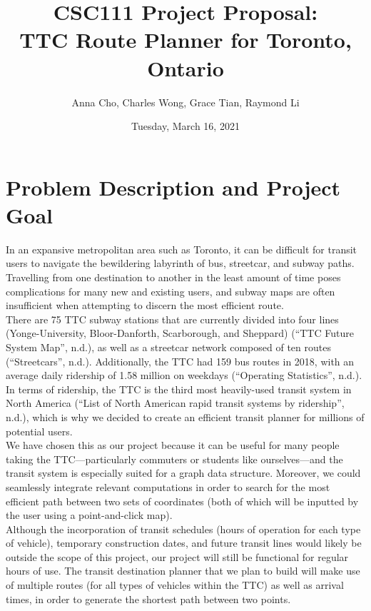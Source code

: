 \documentclass[fontsize=11pt]{article}
\title{CSC111 Project Proposal: \\
TTC Route Planner for Toronto, Ontario}
\author{Anna Cho, Charles Wong, Grace Tian, Raymond Li}
\date{Tuesday, March 16, 2021}
\begin{document}
    \maketitle

    \section*{Problem Description and Project Goal}

    In an expansive metropolitan area such as Toronto, it can be difficult for transit users to navigate the bewildering labyrinth of bus, streetcar, and subway paths. Travelling from one destination to another in the least amount of time poses complications for many new and existing users, and subway maps are often insufficient when attempting to discern the most efficient route. \\

    There are 75 TTC subway stations that are currently divided into four lines (Yonge-University, Bloor-Danforth, Scarborough, and Sheppard) (“TTC Future System Map”, n.d.), as well as a streetcar network composed of ten routes (“Streetcars”, n.d.). Additionally, the TTC had 159 bus routes in 2018, with an average daily ridership of 1.58 million on weekdays (“Operating Statistics”, n.d.). In terms of ridership, the TTC is the third most heavily-used transit system in North America (“List of North American rapid transit systems by ridership”, n.d.), which is why we decided to create an efficient transit planner for millions of potential users. \\

    We have chosen this as our project because it can be useful for many people taking the TTC—particularly commuters or students like ourselves—and the transit system is especially suited for a graph data structure. Moreover, we could seamlessly integrate relevant computations in order to search for the most efficient path between two sets of coordinates (both of which will be inputted by the user using a point-and-click map). \\

    Although the incorporation of transit schedules (hours of operation for each type of vehicle), temporary construction dates, and future transit lines would likely be outside the scope of this project, our project will still be functional for regular hours of use. The transit destination planner that we plan to build will make use of multiple routes (for all types of vehicles within the TTC) as well as arrival times, in order to generate the shortest path between two points. \\
\end{document}
